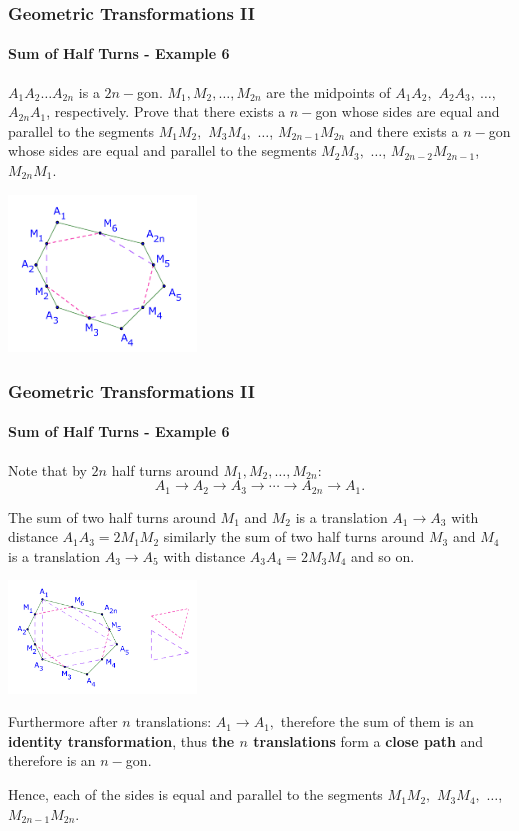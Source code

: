 \documentclass[8pt,xcolor=table,dvipsnames]{beamer}
\begin{document}
\begin{frame}[t]
    \frametitle{Geometric Transformations II}
    \framesubtitle{Sum of Half Turns - Example 6}
    \begin{example}
        $A_1A_2 \ldots A_{2n}$ is a $2n-$gon. $M_1, M_2, \ldots, M_{2n}$ are the midpoints of $A_1A_2,$ $A_2A_3,\ \ldots,$ $A_{2n}A_1$, respectively.
        Prove that there exists a $n-$gon whose sides are equal and parallel to the segments $M_1M_2,$ $M_3M_4,$ $\ldots$, $M_{2n-1}M_{2n}$
        and there exists a $n-$gon whose sides are equal and parallel to the segments $M_2M_3,$ $\ldots$, $M_{2n-2}M_{2n-1}$, $M_{2n}M_1.$ 
    \end{example}

    \begin{center}
        \includegraphics[width=5cm]{./svg/pdf/translation-3a.pdf}
    \end{center}
\end{frame}

\begin{frame}[t]
    \frametitle{Geometric Transformations II}
    \framesubtitle{Sum of Half Turns - Example 6}
    Note that by $2n$ half turns around $M_1, M_2, \ldots, M_{2n}$:
    \[
        A_1 \rightarrow A_2 \rightarrow A_3 \rightarrow  \cdots \rightarrow  A_{2n} \rightarrow A_1.
    \]
    
    The sum of two half turns around $M_1$ and $M_2$ is a translation $A_1 \rightarrow A_3$ with distance $A_1A_3 = 2 M_1M_2$
    similarly the sum of two half turns around $M_3$ and $M_4$ is a translation $A_3 \rightarrow A_5$ with distance $A_3A_4 = 2 M_3M_4$
    and so on.

    \begin{center}
        \includegraphics[width=5cm]{./svg/pdf/translation-3b.pdf}
    \end{center}

    Furthermore after $n$ translations: $A_1 \rightarrow A_1,$ therefore the sum of them is an \textbf{identity transformation},
    thus \textbf{the $n$ translations} form a \textbf{close path} and therefore is an $n-$gon.

    \bigbreak
    Hence, each of the sides is equal and parallel to the segments $M_1M_2,$ $M_3M_4,$ $\ldots$, $M_{2n-1}M_{2n}$.
\end{frame}
\end{document}
